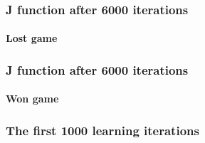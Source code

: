 \documentclass[10pt]{beamer}
\begin{document}
\begin{frame}
  \frametitle{J function after 6000 iterations}
  \framesubtitle{Lost game}
  \begin{center}  \end{center}
\end{frame}

\begin{frame}
  \frametitle{J function after 6000 iterations}
  \framesubtitle{Won game}
  \begin{center}  \end{center}
\end{frame}

\begin{frame}
  \frametitle{The first 1000 learning iterations}
  \begin{center}  \end{center}
\end{frame}
\end{document}
